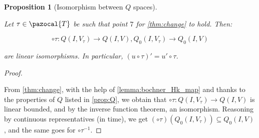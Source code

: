 \documentclass[english,a4paper,10pt,oneside]{scrbook}	%
\theoremstyle{break}
\newtheorem{prop}[equation]{Proposition}
\newenvironment{mproof}[1][\proofname]{%
  \begin{proof}[#1]$ $\par\nobreak\ignorespaces
}{%
  \end{proof}
}
\renewcommand*{\proofname}{Proof}
\theoremstyle{remark}
\newcommand{\norm}[1]{\left\lVert#1\right\rVert}
\newcommand{\tr}{\text{tr}}
\newcommand{\cT}{\pazocal{T}}
\newcommand{\tred}[1]{\textcolor{red}{#1}}
\begin{document}
\begin{appendices}
%
%
%
%
%
%
%
%
%
%		
%


\begin{prop}[Isomorphism between $Q$ spaces]
\label{prop:change_boch}

Let $\tau \in \cT$ be such that point $7$ for \cref{thm:change} to hold. Then:

$$\circ \tau : Q(I,V_\tau)\rightarrow Q(I,V), Q_0(I,V_\tau)\rightarrow Q_0(I,V)$$

are linear isomorphisms. In particular, $(u\circ \tau)' = u'\circ \tau$.

\end{prop}

\begin{mproof}
From \cref{thm:change}, with the help of \cref{lemma:bochner_Hk_map} and thanks to the properties of $Q$ listed in \cref{prop:Q}, we obtain that $\circ \tau : Q(I,V_\tau)\rightarrow Q(I,V)$ is linear bounded, and by the inverse function theorem, an isomorphism. Reasoning by continuous representatives (in time), we get $(\circ \tau)(Q_0(I,V_\tau))\subseteq Q_0(I,V)$, and the same goes for $\circ \tau^{-1}$.
\end{mproof}



\end{appendices}
\end{document}
